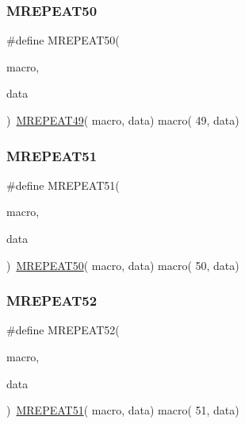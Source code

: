 \mbox{\label{group__group__sam0__utils__mrepeat_gac25633a97dd40a5eec980d04c51d960d}} 
\subsubsection{\texorpdfstring{MREPEAT50}{MREPEAT50}}
{\footnotesize\ttfamily \#define M\+R\+E\+P\+E\+A\+T50(\begin{DoxyParamCaption}\item[{}]{macro,  }\item[{}]{data }\end{DoxyParamCaption})~\mbox{\hyperlink{group__group__sam0__utils__mrepeat_ga0b8f49d449884ed9753850305fd1e31f}{M\+R\+E\+P\+E\+A\+T49}}( macro, data)   macro( 49, data)}

\mbox{\label{group__group__sam0__utils__mrepeat_ga6818ebdd66a3249479701fa34a7994e8}} 
\subsubsection{\texorpdfstring{MREPEAT51}{MREPEAT51}}
{\footnotesize\ttfamily \#define M\+R\+E\+P\+E\+A\+T51(\begin{DoxyParamCaption}\item[{}]{macro,  }\item[{}]{data }\end{DoxyParamCaption})~\mbox{\hyperlink{group__group__sam0__utils__mrepeat_gac25633a97dd40a5eec980d04c51d960d}{M\+R\+E\+P\+E\+A\+T50}}( macro, data)   macro( 50, data)}

\mbox{\label{group__group__sam0__utils__mrepeat_ga321d36cd49e5f6ca5dc7066e7913e634}} 
\subsubsection{\texorpdfstring{MREPEAT52}{MREPEAT52}}
{\footnotesize\ttfamily \#define M\+R\+E\+P\+E\+A\+T52(\begin{DoxyParamCaption}\item[{}]{macro,  }\item[{}]{data }\end{DoxyParamCaption})~\mbox{\hyperlink{group__group__sam0__utils__mrepeat_ga6818ebdd66a3249479701fa34a7994e8}{M\+R\+E\+P\+E\+A\+T51}}( macro, data)   macro( 51, data)}

